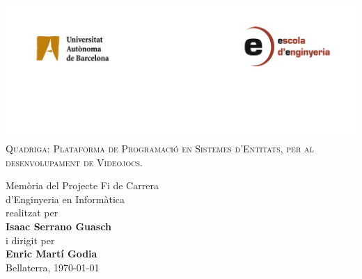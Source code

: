 \begin{titlepage}

\begin{center}


\includegraphics[width=1.00\textwidth]{./img/logoUAB.png}\\[1cm]    

\textsc{\LARGE Quadriga: Plataforma de Programació en Sistemes d'Entitats, per al desenvolupament de Videojocs.}\\[1.5cm]



\end{center}

\begin{flushright}

\vfill

\begin{minipage}{0.4\textwidth}
\end{minipage}
\begin{minipage}{0.6\textwidth}
Memòria del Projecte Fi de Carrera \\
d'Enginyeria en Informàtica \\
realitzat per \\
{\bf Isaac Serrano Guasch} \\
i dirigit per \\
{\bf Enric Martí Godia} \\
Bellaterra, \today
\end{minipage}

\end{flushright}

\end{titlepage}